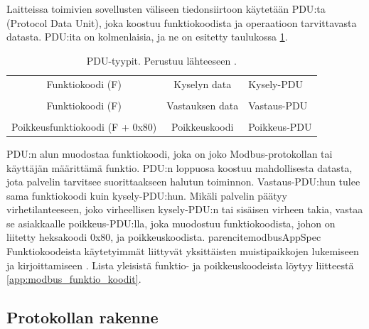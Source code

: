     Laitteissa toimivien sovellusten väliseen tiedonsiirtoon käytetään \gls{PDU}:ta (Protocol Data Unit), joka koostuu funktiokoodista ja operaatioon tarvittavasta datasta. \gls{PDU}:ita on kolmenlaisia, ja ne on esitetty taulukossa \ref{pdu}.
    \begin{table}[h]
      \centering
      \caption[\gls{PDU}-tyypit.]{\gls{PDU}-tyypit. Perustuu lähteeseen \parencite{modbusAppSpec}.}
      \begin{tabular}{ccl}
      \cline{1-2}
      \multicolumn{1}{|c|}{\cellcolor[HTML]{5CB735}Funktiokoodi (F)}                & \multicolumn{1}{c|}{\cellcolor[HTML]{5CB735}Kyselyn data}    & Kysely-PDU   \\ \cline{1-2}
                                                                                    &                                                              &              \\ \cline{1-2}
      \multicolumn{1}{|c|}{\cellcolor[HTML]{5CB735}Funktiokoodi (F)}                & \multicolumn{1}{c|}{\cellcolor[HTML]{5CB735}Vastauksen data} & Vastaus-PDU  \\ \cline{1-2}
                                                                                    &                                                              &              \\ \cline{1-2}
      \multicolumn{1}{|c|}{\cellcolor[HTML]{D78989}Poikkeusfunktiokoodi (F + 0x80)} & \multicolumn{1}{c|}{\cellcolor[HTML]{D78989}Poikkeuskoodi}   & Poikkeus-PDU \\ \cline{1-2}
    \end{tabular}
      \label{pdu}
    \end{table}

    \gls{PDU}:n alun muodostaa funktiokoodi, joka on joko Modbus-protokollan tai käyttäjän määrittämä funktio. PDU:n loppuosa koostuu mahdollisesta datasta, jota palvelin tarvitsee suorittaakseen halutun toiminnon. Vastaus-PDU:hun tulee sama funktiokoodi kuin kysely-PDU:hun. Mikäli palvelin päätyy virhetilanteeseen, joko virheellisen kysely-PDU:n tai sisäisen virheen takia, vastaa se asiakkaalle poikkeus-PDU:lla, joka muodostuu funktiokoodista, johon on liitetty heksakoodi 0x80, ja poikkeuskoodista. parencite{modbusAppSpec} Funktiokoodeista käytetyimmät liittyvät yksittäisten muistipaikkojen lukemiseen ja kirjoittamiseen \parencite{DincerRosen}. Lista yleisistä funktio- ja poikkeuskoodeista löytyy liitteestä \ref{app:modbus_funktio_koodit}.


  \subsection{Protokollan rakenne}

